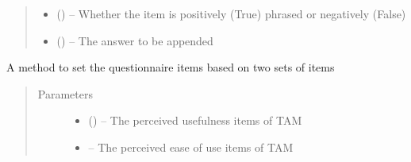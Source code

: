 \documentclass[letterpaper,10pt,english]{sphinxmanual}
\begin{document}
\begin{fulllineitems}
\begin{fulllineitems}
\begin{quote}
\begin{description}
\begin{itemize}
\item {} 
 (\href{https://docs.python.org/2/library/functions.html\#bool}{}) -- Whether the item is positively (True) phrased or negatively (False)

\item {} 
 (\href{https://docs.python.org/2/library/string.html\#module-string}{}) -- The answer to be appended

\end{itemize}

\end{description}\end{quote}

\end{fulllineitems}


\begin{fulllineitems}
\label{\detokenize{questionnaire:questionnaire.Questionnaire.generate_questionnaire}}
A method to set the questionnaire items based on two sets of items
\begin{quote}\begin{description}
\item[{Parameters}] \leavevmode\begin{itemize}
\item {} 
 (\href{https://docs.python.org/2/library/functions.html\#list}{}\sphinxstyleliteralemphasis{)}\sphinxstyleliteralemphasis{}) -- The perceived usefulness items of TAM

\item {} 
 -- The perceived ease of use items of TAM

\end{itemize}

\end{description}\end{quote}

\end{fulllineitems}


\end{fulllineitems}
\end{document}
